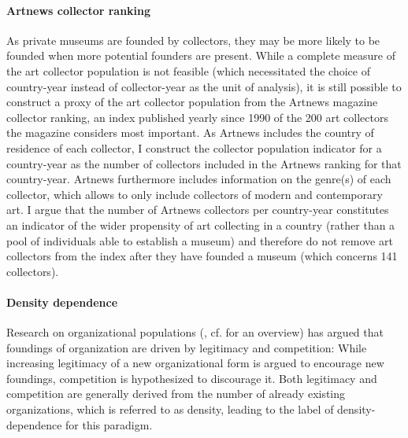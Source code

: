 \documentclass[11pt, authoryear]{elsarticle}
\begin{document}
\paragraph*{Artnews collector ranking}

As private museums are founded by collectors, they may be more likely to be founded when more potential founders are present.
While a complete measure of the art collector population is not feasible (which necessitated the choice of country-year instead of collector-year as the unit of analysis), it is still possible to construct a proxy of the art collector population from the Artnews magazine collector ranking, an index published yearly since 1990 of the 200 art collectors the magazine considers most important.
As Artnews includes the country of residence of each collector, I construct the collector population indicator for a country-year as the number of collectors included in the Artnews ranking for that country-year.
Artnews furthermore includes information on the genre(s) of each collector, which allows to only include collectors of modern and contemporary art.
I argue that the number of Artnews collectors per country-year constitutes an indicator of the wider propensity of art collecting in a country (rather than a pool of individuals able to establish a museum) and therefore do not remove art collectors from the index after they have founded a museum (which concerns 141 collectors).



\paragraph*{Density dependence}

Research on organizational populations (\citealt{Hannan_1992_dynamics}, cf. \citealt{Carroll_Khessina_2019_demography} for an overview) has argued that foundings of organization are driven by legitimacy and competition:
While increasing legitimacy of a new organizational form is argued to encourage new foundings, competition is hypothesized to discourage it.
Both legitimacy and competition are generally derived from the number of already existing organizations, which is referred to as density, leading to the label of density-dependence for this paradigm. 
\end{document}

